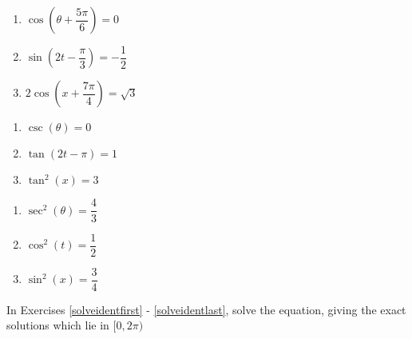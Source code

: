 \documentclass{ximera}
\begin{document}
\begin{multicols}{3}

\begin{enumerate}

\setcounter{enumi}{\value{HW}}

\item $\cos \left( \theta+ \dfrac{5\pi}{6} \right) = 0$
\item $\sin \left( 2t - \dfrac{\pi}{3} \right) = -\dfrac{1}{2}$
\item $2\cos \left( x + \dfrac{7\pi}{4} \right) = \sqrt{3}$

\setcounter{HW}{\value{enumi}}

\end{enumerate}

\end{multicols}

\begin{multicols}{3}

\begin{enumerate}

\setcounter{enumi}{\value{HW}}

\item $\csc( \theta) = 0$
\item $\tan \left( 2t - \pi \right) = 1$
\item $\tan^{2} \left( x \right) = 3$

\setcounter{HW}{\value{enumi}}

\end{enumerate}

\end{multicols}

\begin{multicols}{3}

\begin{enumerate}

\setcounter{enumi}{\value{HW}}

\item $\sec^{2} \left( \theta \right) = \dfrac{4}{3}$
\item $\cos^{2} \left( t \right) = \dfrac{1}{2}$
\item $\sin^{2} \left( x \right) = \dfrac{3}{4}$ \label{solvebasiclast}

\setcounter{HW}{\value{enumi}}

\end{enumerate}

\end{multicols}

In Exercises \ref{solveidentfirst} - \ref{solveidentlast}, solve the equation, giving the exact solutions which lie in $[0, 2\pi)$
\end{document}
